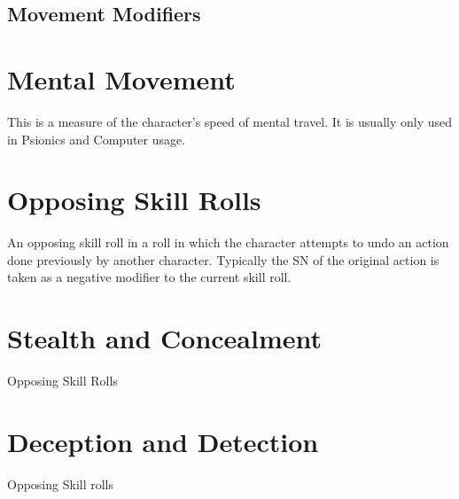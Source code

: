 \subsection{Movement Modifiers}



\section{Mental Movement}
This is a measure of the character's speed of mental travel. It is 
usually only used in Psionics and Computer usage.

\section{Opposing Skill Rolls}

An opposing skill roll in a roll in which the character attempts to 
undo an action done previously by another character. Typically the SN 
of the original action is taken as a negative modifier to the current 
skill roll.

\section{Stealth and Concealment}

Opposing Skill Rolls

\section{Deception and Detection}

Opposing Skill rolls

